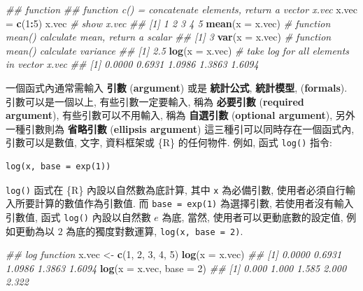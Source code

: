 \documentclass[
]{book}
\newenvironment{Shaded}{\begin{snugshade}}{\end{snugshade}}
\newcommand{\CommentTok}[1]{\textcolor[rgb]{0.56,0.35,0.01}{\textit{#1}}}
\newcommand{\DataTypeTok}[1]{\textcolor[rgb]{0.13,0.29,0.53}{#1}}
\newcommand{\DecValTok}[1]{\textcolor[rgb]{0.00,0.00,0.81}{#1}}
\newcommand{\KeywordTok}[1]{\textcolor[rgb]{0.13,0.29,0.53}{\textbf{#1}}}
\newcommand{\NormalTok}[1]{#1}
\newcommand{\OperatorTok}[1]{\textcolor[rgb]{0.81,0.36,0.00}{\textbf{#1}}}
\newcommand{\StringTok}[1]{\textcolor[rgb]{0.31,0.60,0.02}{#1}}
\begin{document}
\begin{Shaded}
\begin{Highlighting}[]
\CommentTok{\#\# function}
\CommentTok{\#\# function c() = concatenate elements, return a vector x.vec}
\NormalTok{x.vec =}\StringTok{ }\KeywordTok{c}\NormalTok{(}\DecValTok{1}\OperatorTok{:}\DecValTok{5}\NormalTok{) }
\NormalTok{x.vec }\CommentTok{\# show x.vec }
\CommentTok{\#\# [1] 1 2 3 4 5}
\KeywordTok{mean}\NormalTok{(}\DataTypeTok{x =}\NormalTok{ x.vec) }\CommentTok{\# function mean() calculate mean, return a scalar}
\CommentTok{\#\# [1] 3}
\KeywordTok{var}\NormalTok{(}\DataTypeTok{x =}\NormalTok{ x.vec)  }\CommentTok{\# function mean() calculate variance}
\CommentTok{\#\# [1] 2.5}
\KeywordTok{log}\NormalTok{(}\DataTypeTok{x =}\NormalTok{ x.vec)  }\CommentTok{\# take log for all elements in vector x.vec}
\CommentTok{\#\# [1] 0.0000 0.6931 1.0986 1.3863 1.6094}
\end{Highlighting}
\end{Shaded}

一個函式內通常需輸入
\textbf{引數}
(\textbf{argument})
或是
\textbf{統計公式},
\textbf{統計模型},
(\textbf{formals}).
引數可以是一個以上,
有些引數一定要輸入,
稱為
\textbf{必要引數}
(\textbf{required argument}),
有些引數可以不用輸入,
稱為
\textbf{自選引數}
(\textbf{optional argument}),
另外一種引數則為
\textbf{省略引數}
(\textbf{ellipsis argument})
這三種引可以同時存在一個函式內,
引數可以是數值, 文字, 資料框架或 \{R\} 的任何物件.
例如, 函式 \texttt{log()} 指令:

\begin{verbatim}
log(x, base = exp(1))     
\end{verbatim}

\texttt{log()} 函式在 \{R\} 內設以自然數為底計算,
其中 \texttt{x} 為必備引數,
使用者必須自行輸入所要計算的數值作為引數值.
而 \texttt{base\ =\ exp(1)}
為選擇引數,
若使用者沒有輸入引數值,
函式 \texttt{log()} 內設以自然數 \(e\) 為底,
當然, 使用者可以更動底數的設定值,
例如更動為以 \(2\) 為底的獨度對數運算,
\texttt{log(x,\ base\ =\ 2)}.

\begin{Shaded}
\begin{Highlighting}[]
\CommentTok{\#\# log function}
\NormalTok{x.vec \textless{}{-}}\StringTok{ }\KeywordTok{c}\NormalTok{(}\DecValTok{1}\NormalTok{, }\DecValTok{2}\NormalTok{, }\DecValTok{3}\NormalTok{, }\DecValTok{4}\NormalTok{, }\DecValTok{5}\NormalTok{)}
\KeywordTok{log}\NormalTok{(}\DataTypeTok{x =}\NormalTok{ x.vec)}
\CommentTok{\#\# [1] 0.0000 0.6931 1.0986 1.3863 1.6094}
\KeywordTok{log}\NormalTok{(}\DataTypeTok{x =}\NormalTok{ x.vec, }\DataTypeTok{base =} \DecValTok{2}\NormalTok{)}
\CommentTok{\#\# [1] 0.000 1.000 1.585 2.000 2.322}
\end{Highlighting}
\end{Shaded}
\end{document}
